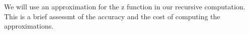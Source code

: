 We will use an approximation for the z function in our recursive computation.
This is a brief assessmt of the accuracy and the cost of computing the approximations.



